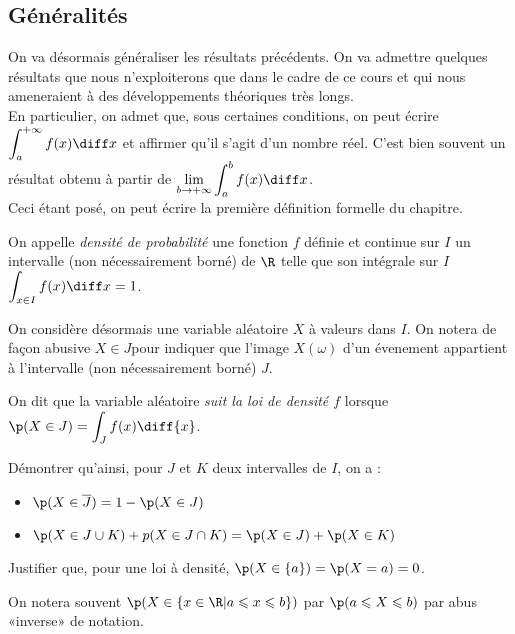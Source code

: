 \documentclass[12pt,a4paper,french]{article}
\begin{document}
\subsection{Généralités}

On va désormais généraliser les résultats précédents. On va admettre
quelques résultats que nous n'exploiterons que dans le cadre de ce cours
et qui nous ameneraient à des développements théoriques très longs.\\
En particulier, on admet que, sous certaines conditions, on peut écrire
$\displaystyle\int_a^{+\infty}f(x)\diff x$ et affirmer qu'il s'agit d'un
nombre réel.
C'est bien souvent un résultat obtenu à partir de
$\displaystyle\lim_{b\to+\infty}\displaystyle\int_a^b f(x) \diff x$.\\
Ceci étant posé, on peut écrire la première définition formelle du
chapitre.

\begin{definition}
  On appelle \emph{densité de probabilité} une fonction $f$ définie et
  continue sur $I$ un intervalle (non nécessairement borné) de $\R$
  telle que son intégrale sur $I$ $\displaystyle\int_{x\in I}f(x) \diff x =
  1$.
\end{definition}

On considère désormais une variable aléatoire $X$ à valeurs dans $I$. On
notera de façon abusive $X \in J$pour indiquer que l'image $X(\omega)$
d'un évenement appartient à l'intervalle (non nécessairement borné) $J$.

\begin{definition}
  On dit que la variable aléatoire \emph{suit la loi de densité $f$}
  lorsque $\p(X\in J) = \displaystyle\int_{J} f(x)\diff{x}$.
\end{definition}

\begin{question}
  Démontrer qu'ainsi, pour $J$ et $K$ deux intervalles de $I$, on a :
  \begin{itemize}
    \item $\p(X\in \overline{J}) = 1 - \p(X\in J)$
    \item $\p(X\in J \cup K) + p(X\in J \cap K) = \p(X\in J) + \p(X\in K)$
  \end{itemize}
  Justifier que, pour une loi à densité, $\p(X \in \{a\}) = \p(X = a) = 0$.
\end{question}

On notera souvent $\p(X\in \{x\in \R | a\leqslant x \leqslant b\})$ par
$\p(a \leqslant X \leqslant b)$ par abus «inverse» de notation.
\end{document}
